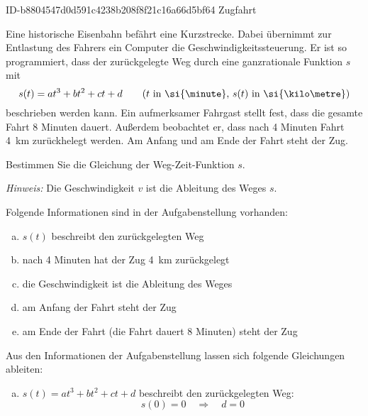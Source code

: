 \begin{exercise}
      {ID-b8804547d0d591c4238b208f8f21c16a66d5bf64}
      {Zugfahrt}
  \ifproblem\problem\par
    Eine historische Eisenbahn befährt eine Kurzstrecke.
    Dabei übernimmt zur Entlastung des Fahrers ein Computer
    die Geschwindigkeitssteuerung. Er ist so programmiert,
    dass der zurückgelegte Weg durch eine ganzrationale
    Funktion $s$ mit
    \begin{equation*}
      s(t)=at^3+bt^2+ct+d
      \qquad\text{($t$ in \si{\minute}, $s(t)$ in \si{\kilo\metre})}
    \end{equation*}
    beschrieben werden kann.
    Ein aufmerksamer Fahrgast stellt fest, dass
    die gesamte Fahrt 8 Minuten dauert. Außerdem
    beobachtet er, dass nach 4 Minuten Fahrt
    \SI{4}{\kilo\metre} zurückhelegt werden.
    Am Anfang und am Ende der Fahrt steht der Zug.
    \par
    Bestimmen Sie die Gleichung der
    Weg-Zeit-Funktion $s$.
    \par
    \textit{Hinweis:} Die Geschwindigkeit $v$ ist
    die Ableitung des Weges $s$.
  \fi
  \ifoutline\outline\par
    Folgende Informationen sind in der
    Aufgabenstellung vorhanden:
    \begin{enumerate}[a)]
      \item $s(t)$ beschreibt den zurückgelegten Weg
      \item nach 4 Minuten hat der Zug
            \SI{4}{\kilo\metre} zurückgelegt
      \item die Geschwindigkeit ist die Ableitung des Weges
      \item am Anfang der Fahrt steht der Zug
      \item am Ende der Fahrt (die Fahrt dauert
            8 Minuten) steht der Zug
    \end{enumerate}
  \fi
  \ifoutcome\outcome\par
    Aus den Informationen der Aufgabenstellung
    lassen sich folgende Gleichungen ableiten:
    \begin{enumerate}[a)]
      \item $s(t)=at^3+bt^2+ct+d$ beschreibt den
            zurückgelegten Weg:
            \begin{equation*}
              s(0)=0
              \quad\Rightarrow\quad
              d=0
            \end{equation*}

\end{enumerate}
\end{exercise}
